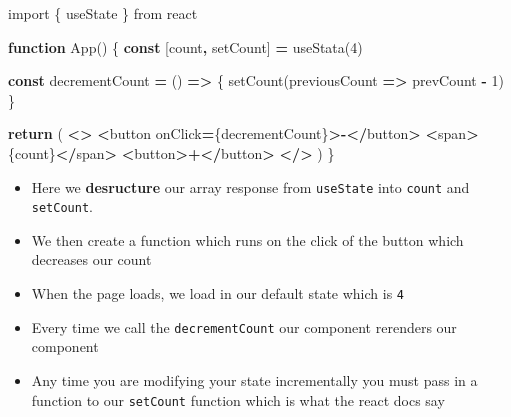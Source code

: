 \documentclass[
]{report}
\newenvironment{Shaded}{\begin{snugshade}}{\end{snugshade}}
\newcommand{\ControlFlowTok}[1]{\textcolor[rgb]{0.13,0.29,0.53}{\textbf{#1}}}
\newcommand{\DecValTok}[1]{\textcolor[rgb]{0.00,0.00,0.81}{#1}}
\newcommand{\FunctionTok}[1]{\textcolor[rgb]{0.00,0.00,0.00}{#1}}
\newcommand{\ImportTok}[1]{#1}
\newcommand{\KeywordTok}[1]{\textcolor[rgb]{0.13,0.29,0.53}{\textbf{#1}}}
\newcommand{\NormalTok}[1]{#1}
\newcommand{\OperatorTok}[1]{\textcolor[rgb]{0.81,0.36,0.00}{\textbf{#1}}}
\newcommand{\StringTok}[1]{\textcolor[rgb]{0.31,0.60,0.02}{#1}}
\providecommand{\tightlist}{%
  \setlength{\itemsep}{0pt}\setlength{\parskip}{0pt}}
\begin{document}
\begin{Shaded}
\begin{Highlighting}[]
\ImportTok{import}\NormalTok{ \{ useState \} }\ImportTok{from} \StringTok{\textquotesingle{}react\textquotesingle{}}

\KeywordTok{function} \FunctionTok{App}\NormalTok{() \{}
    \KeywordTok{const}\NormalTok{ [count}\OperatorTok{,}\NormalTok{ setCount] }\OperatorTok{=} \FunctionTok{useStata}\NormalTok{(}\DecValTok{4}\NormalTok{)}

    \KeywordTok{const}\NormalTok{ decrementCount }\OperatorTok{=}\NormalTok{ () }\KeywordTok{=\textgreater{}}\NormalTok{ \{}
        \FunctionTok{setCount}\NormalTok{(previousCount }\KeywordTok{=\textgreater{}}\NormalTok{ prevCount }\OperatorTok{{-}} \DecValTok{1}\NormalTok{)}
\NormalTok{    \}}

    \ControlFlowTok{return}\NormalTok{ (}
        \OperatorTok{\textless{}\textgreater{}}
            \OperatorTok{\textless{}}\NormalTok{button onClick}\OperatorTok{=}\NormalTok{\{decrementCount\}}\OperatorTok{\textgreater{}{-}\textless{}/}\NormalTok{button}\OperatorTok{\textgreater{}}
            \OperatorTok{\textless{}}\NormalTok{span}\OperatorTok{\textgreater{}}\NormalTok{\{count\}}\OperatorTok{\textless{}/}\NormalTok{span}\OperatorTok{\textgreater{}}
            \OperatorTok{\textless{}}\NormalTok{button}\OperatorTok{\textgreater{}+\textless{}/}\NormalTok{button}\OperatorTok{\textgreater{}}
        \OperatorTok{\textless{}/\textgreater{}}
\NormalTok{    )}
\NormalTok{\}}
\end{Highlighting}
\end{Shaded}

\begin{itemize}
\tightlist
\item
  Here we \textbf{desructure} our array response from \texttt{useState} into \texttt{count} and
  \texttt{setCount}.
\item
  We then create a function which runs on the click of the button which
  decreases our count
\item
  When the page loads, we load in our default state which is \texttt{4}
\item
  Every time we call the \texttt{decrementCount} our component rerenders our component
\item
  Any time you are modifying your state incrementally you must pass in a
  function to our \texttt{setCount} function which is what the react docs say
\end{itemize}
\end{document}
